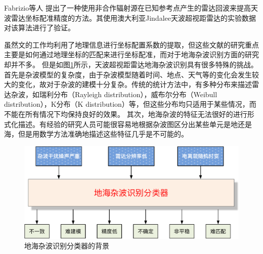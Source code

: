 Fabrizio等人\cite{fabrizio2016using} 提出了一种使用非合作辐射源在已知参考点产生的雷达回波来提高天波雷达坐标配准精度的方法。其使用澳大利亚Jindalee天波超视距雷达的实验数据对该算法进行了验证。
%

虽然文\cite{weijers1995oth, fabrizio2016using, wheadon1994ionospheric, anderson1995auto, cuccoli2009over, cuccoli2009over2, cuccoli2010sea, cuccoli2011coordinate, cacciamano2012coordinate}的工作均利用了地理信息进行坐标配置系数的提取，但这些文献的研究重点主要是如何通过地理坐标的匹配来进行坐标配准，而对于地海杂波识别方面的研究却并不多。
但是如图\ref{fig:clutterproblem}所示，天波超视距雷达地海杂波识别具有很多特殊的挑战。首先是杂波模型的复杂度，由于杂波模型随着时间、地点、天气等的变化会发生较大的变化，故对于杂波的建模十分复杂。传统的统计方法中，有多种分布来描述雷达杂波，如瑞利分布（Rayleigh distribution），威布尔分布（Weibull distribution），K分布（K distribution）等，但这些分布均只适用于某些情况，而不能在所有情况下均保持良好的效果。
其次，地海杂波的特征无法很好的进行形式化描述。有经验的研究人员可能很容易地根据杂波图区分出某些单元是地还是海，但是用数学方法准确地描述这些特征几乎是不可能的。
\begin{figure}[htb]
	\centering
	\includegraphics[width=\textwidth]{figures/othr/othr_classification.pdf}
	\caption{地海杂波识别分类器的背景}
	\label{fig:clutterproblem}
\end{figure}

